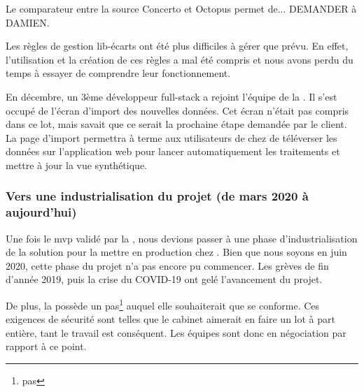 Le comparateur entre la source Concerto et Octopus permet de... DEMANDER à DAMIEN.

Les règles de gestion lib-écarts ont été plus difficiles à gérer que prévu. En effet, l'utilisation et la création de ces règles a mal été compris et nous avons perdu du temps à essayer de comprendre leur fonctionnement.

En décembre, un 3ème développeur \gls{full-stack} a rejoint l'équipe de la \df. Il s'est occupé de l'écran d'import des nouvelles données. Cet écran n'était pas compris dans ce lot, mais \damien savait que ce serait la prochaine étape demandée par le client. La page d'import permettra à terme aux utilisateurs de chez \sncf de téléverser les données sur l'application web pour lancer automatiquement les traitements et mettre à jour la vue synthétique.

\subsubsection{Vers une industrialisation du projet (de mars 2020 à aujourd'hui)}


Une fois le \gls{mvp} validé par la \sncf, nous devions passer à une phase d'industrialisation de la solution pour la mettre en production chez \sncf.
Bien que nous soyons en juin 2020, cette phase du projet n'a pas encore pu commencer. Les grèves de fin d'année 2019, puis la crise du \textsc{COVID-19} ont gelé l'avancement du projet.

De plus, la \sncf possède un \gls{pas}\footnote{\glsdesc{pas}} auquel elle souhaiterait que \tnp se conforme. Ces exigences de sécurité sont telles que le cabinet aimerait en faire un lot à part entière, tant le travail est conséquent. Les équipes sont donc en négociation par rapport à ce point.

